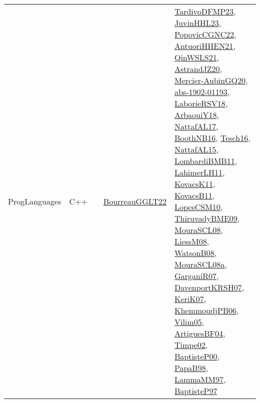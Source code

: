 {\begin{longtable}{lp{3cm}>{\raggedright}p{6cm}>{\raggedright}p{6cm}p{8cm}}
ProgLanguages & C++ &  & \href{articles/BourreauGGLT22.pdf}{BourreauGGLT22}\cite{BourreauGGLT22} & \href{papers/TardivoDFMP23.pdf}{TardivoDFMP23}\cite{TardivoDFMP23}, \href{papers/JuvinHHL23.pdf}{JuvinHHL23}\cite{JuvinHHL23}, \href{papers/PopovicCGNC22.pdf}{PopovicCGNC22}\cite{PopovicCGNC22}, \href{papers/AntuoriHHEN21.pdf}{AntuoriHHEN21}\cite{AntuoriHHEN21}, \href{articles/QinWSLS21.pdf}{QinWSLS21}\cite{QinWSLS21}, \href{articles/AstrandJZ20.pdf}{AstrandJZ20}\cite{AstrandJZ20}, \href{papers/Mercier-AubinGQ20.pdf}{Mercier-AubinGQ20}\cite{Mercier-AubinGQ20}, \href{articles/abs-1902-01193.pdf}{abs-1902-01193}\cite{abs-1902-01193}, \href{articles/LaborieRSV18.pdf}{LaborieRSV18}\cite{LaborieRSV18}, \href{papers/ArbaouiY18.pdf}{ArbaouiY18}\cite{ArbaouiY18}, \href{articles/NattafAL17.pdf}{NattafAL17}\cite{NattafAL17}, \href{papers/BoothNB16.pdf}{BoothNB16}\cite{BoothNB16}, \href{papers/Tesch16.pdf}{Tesch16}\cite{Tesch16}, \href{articles/NattafAL15.pdf}{NattafAL15}\cite{NattafAL15}, \href{papers/LombardiBMB11.pdf}{LombardiBMB11}\cite{LombardiBMB11}, \href{papers/LahimerLH11.pdf}{LahimerLH11}\cite{LahimerLH11}, \href{articles/KovacsK11.pdf}{KovacsK11}\cite{KovacsK11}, \href{articles/KovacsB11.pdf}{KovacsB11}\cite{KovacsB11}, \href{articles/LopesCSM10.pdf}{LopesCSM10}\cite{LopesCSM10}, \href{papers/ThiruvadyBME09.pdf}{ThiruvadyBME09}\cite{ThiruvadyBME09}, \href{papers/MouraSCL08.pdf}{MouraSCL08}\cite{MouraSCL08}, \href{articles/LiessM08.pdf}{LiessM08}\cite{LiessM08}, \href{papers/WatsonB08.pdf}{WatsonB08}\cite{WatsonB08}, \href{papers/MouraSCL08a.pdf}{MouraSCL08a}\cite{MouraSCL08a}, \href{papers/GarganiR07.pdf}{GarganiR07}\cite{GarganiR07}, \href{papers/DavenportKRSH07.pdf}{DavenportKRSH07}\cite{DavenportKRSH07}, \href{papers/KeriK07.pdf}{KeriK07}\cite{KeriK07}, \href{papers/KhemmoudjPB06.pdf}{KhemmoudjPB06}\cite{KhemmoudjPB06}, \href{papers/Vilim05.pdf}{Vilim05}\cite{Vilim05}, \href{papers/ArtiguesBF04.pdf}{ArtiguesBF04}\cite{ArtiguesBF04}, \href{articles/Timpe02.pdf}{Timpe02}\cite{Timpe02}, \href{articles/BaptisteP00.pdf}{BaptisteP00}\cite{BaptisteP00}, \href{articles/PapaB98.pdf}{PapaB98}\cite{PapaB98}, \href{articles/LammaMM97.pdf}{LammaMM97}\cite{LammaMM97}, \href{papers/BaptisteP97.pdf}{BaptisteP97}\cite{BaptisteP97}\\

\end{longtable}}
